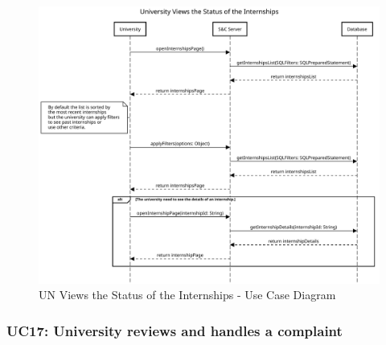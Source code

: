 \begin{figure}[H]
    \centering
    \includegraphics[width=1.0\textwidth]{Images/UC_15.pdf}
    \caption{UN Views the Status of the Internships - Use Case Diagram}
    \label{fig:use-case-diagram-16}
\end{figure}


\subsubsection{UC17: University reviews and handles a complaint}
\label{subsubsec:university-reviews-and-handles-a-complaint}

